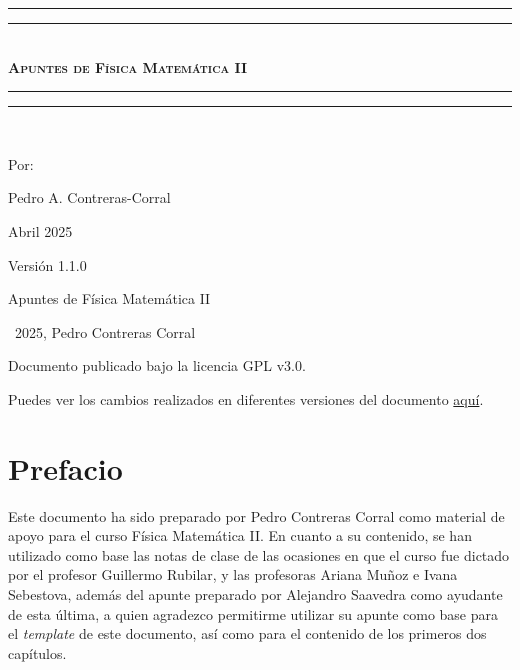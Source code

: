 \documentclass[letterpaper,12pt, twoside]{book}
\newlength{\drop}
\theoremstyle{definition}
\begin{document}
\newpage

\thispagestyle{empty}


\newpage

\begin{titlepage}
 \textheight
    \centering
    \vspace*{\baselineskip}
    \rule{\textwidth}{1.6pt}\vspace*{-\baselineskip}\vspace*{2pt}
    \rule{\textwidth}{0.4pt}\\[\baselineskip]
    {\scshape\bfseries\Huge{}\selectfont Apuntes de Física Matemática II} \\[0.2\baselineskip]
    \rule{\textwidth}{0.4pt}\vspace*{-\baselineskip}\vspace{3.2pt}
    \rule{\textwidth}{1.6pt}\\[\baselineskip]
    {\Large Por: \par}
{\large Pedro A. Contreras-Corral \par}
{\large Abril 2025 \par}
\vfill
{\large Versión 1.1.0 \par}
\end{titlepage}

\mbox{} 
\vfill
Apuntes de Física Matemática II 

\textcopyright\ 2025, Pedro Contreras Corral %



Documento publicado bajo la licencia GPL v3.0.

Puedes ver los cambios realizados en diferentes versiones del documento \href{https://github.com/Pedroga-cc/Fisica-Matematica-II/blob/main/changelog.txt}{aquí}.


\vspace{1cm} 

\restoregeometry

\chapter*{Prefacio}

Este documento ha sido preparado por Pedro Contreras Corral como material de apoyo para el curso Física Matemática II. En cuanto a su contenido, se han utilizado como base las notas de clase de las ocasiones en que el curso fue dictado por el profesor Guillermo Rubilar, y las profesoras Ariana Muñoz e Ivana Sebestova, además del apunte preparado por Alejandro Saavedra como ayudante de esta última, a quien agradezco permitirme utilizar su apunte como base para el \emph{template} de este documento, así como para el contenido de los primeros dos capítulos.
\end{document}
